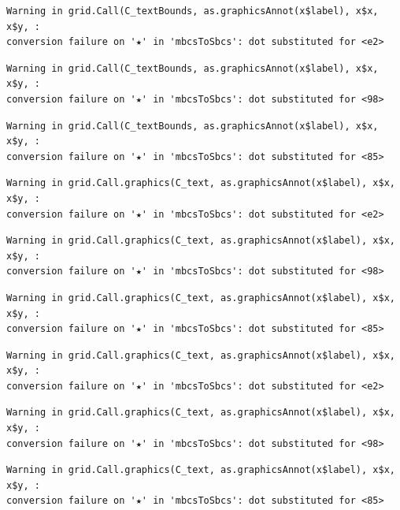 \documentclass[
  letterpaper,
  DIV=11,
  numbers=noendperiod]{scrreprt}
\begin{document}
\begin{verbatim}
Warning in grid.Call(C_textBounds, as.graphicsAnnot(x$label), x$x, x$y, :
conversion failure on '★' in 'mbcsToSbcs': dot substituted for <e2>
\end{verbatim}

\begin{verbatim}
Warning in grid.Call(C_textBounds, as.graphicsAnnot(x$label), x$x, x$y, :
conversion failure on '★' in 'mbcsToSbcs': dot substituted for <98>
\end{verbatim}

\begin{verbatim}
Warning in grid.Call(C_textBounds, as.graphicsAnnot(x$label), x$x, x$y, :
conversion failure on '★' in 'mbcsToSbcs': dot substituted for <85>
\end{verbatim}

\begin{verbatim}
Warning in grid.Call.graphics(C_text, as.graphicsAnnot(x$label), x$x, x$y, :
conversion failure on '★' in 'mbcsToSbcs': dot substituted for <e2>
\end{verbatim}

\begin{verbatim}
Warning in grid.Call.graphics(C_text, as.graphicsAnnot(x$label), x$x, x$y, :
conversion failure on '★' in 'mbcsToSbcs': dot substituted for <98>
\end{verbatim}

\begin{verbatim}
Warning in grid.Call.graphics(C_text, as.graphicsAnnot(x$label), x$x, x$y, :
conversion failure on '★' in 'mbcsToSbcs': dot substituted for <85>
\end{verbatim}

\begin{verbatim}
Warning in grid.Call.graphics(C_text, as.graphicsAnnot(x$label), x$x, x$y, :
conversion failure on '★' in 'mbcsToSbcs': dot substituted for <e2>
\end{verbatim}

\begin{verbatim}
Warning in grid.Call.graphics(C_text, as.graphicsAnnot(x$label), x$x, x$y, :
conversion failure on '★' in 'mbcsToSbcs': dot substituted for <98>
\end{verbatim}

\begin{verbatim}
Warning in grid.Call.graphics(C_text, as.graphicsAnnot(x$label), x$x, x$y, :
conversion failure on '★' in 'mbcsToSbcs': dot substituted for <85>
\end{verbatim}
\end{document}
